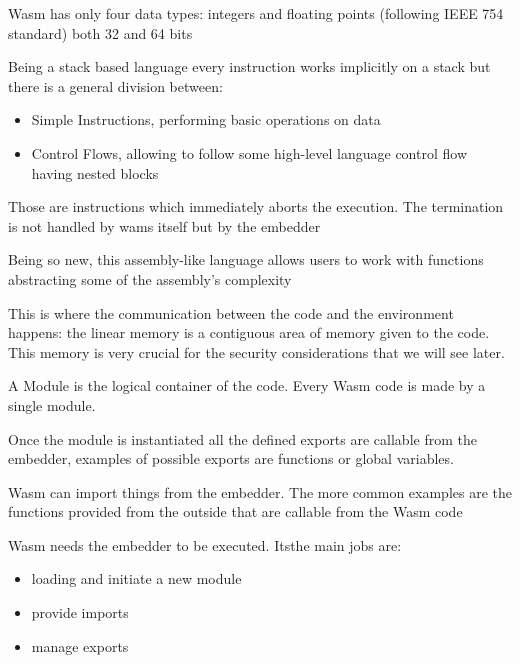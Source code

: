 \begin{description}[font=$\bullet$ \scshape\bfseries]
  \item[Values]
        Wasm has only four data types: integers and floating points (following IEEE 754 standard) both 32 and 64 bits
  \item[Instructions]
        Being a stack based language every instruction works implicitly on a stack but there is a general division between:
        \begin{itemize}
          \item Simple Instructions, performing basic operations on data
          \item Control Flows, allowing to follow some high-level language control flow having nested blocks
        \end{itemize}
  \item[Traps]
        Those are instructions which immediately aborts the execution. The termination is not handled by wams itself but by the embedder
  \item[Functions]
        Being so new, this assembly-like language allows users to work with functions abstracting some of the assembly's complexity
  \item[Linear Memory]
        This is where the communication between the code and the environment happens: the linear memory is a contiguous area of memory given to the code. This memory is very crucial for the security considerations that we will see later.
  \item[Modules]
        A Module is the logical container of the code. Every Wasm code is made by a single module.
  \item[Exports] Once the module is instantiated all the defined exports are callable from the embedder, examples of possible exports are functions or global variables.
  \item[Imports] Wasm can import things from the embedder. The more common examples are the functions provided from the outside that are callable from the Wasm code
  \item[Embedder]
        Wasm needs the embedder to be executed. Itsthe main jobs are:
        \begin{itemize}
          \item loading and initiate a new module
          \item provide imports
          \item manage exports
        \end{itemize}
\end{description}

